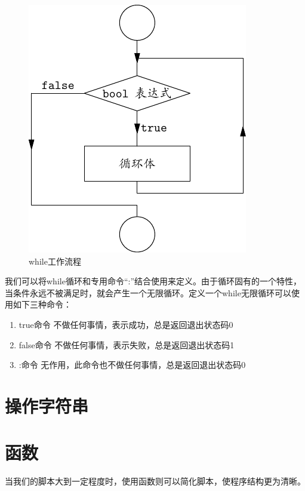 \begin{figure}[!htbp]
  \centering
  \includegraphics{graph/while.pdf}
    \caption{while工作流程}
  \label{fig:while_workflow}
\end{figure}



我们可以将while循环和专用命令“:”结合使用来定义。由于循环固有的一个特性，
当条件永远不被满足时，就会产生一个无限循环。定义一个while无限循环可以使
用如下三种命令：

\begin{enumerate}
\item true命令 \- 不做任何事情，表示成功，总是返回退出状态码0
\item false命令 \- 不做任何事情，表示失败，总是返回退出状态码1
\item :命令 \- 无作用，此命令也不做任何事情，总是返回退出状态码0
\end{enumerate}

\section{操作字符串}

\section{函数}

当我们的脚本大到一定程度时，使用函数则可以简化脚本，使程序结构更为清晰。


